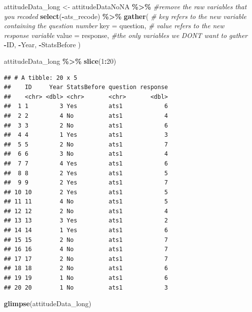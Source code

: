 \documentclass[
  12pt,
]{book}
\newenvironment{Shaded}{\begin{snugshade}}{\end{snugshade}}
\newcommand{\AttributeTok}[1]{\textcolor[rgb]{0.13,0.29,0.53}{#1}}
\newcommand{\CommentTok}[1]{\textcolor[rgb]{0.56,0.35,0.01}{\textit{#1}}}
\newcommand{\DecValTok}[1]{\textcolor[rgb]{0.00,0.00,0.81}{#1}}
\newcommand{\FunctionTok}[1]{\textcolor[rgb]{0.13,0.29,0.53}{\textbf{#1}}}
\newcommand{\NormalTok}[1]{#1}
\newcommand{\OtherTok}[1]{\textcolor[rgb]{0.56,0.35,0.01}{#1}}
\newcommand{\SpecialCharTok}[1]{\textcolor[rgb]{0.81,0.36,0.00}{\textbf{#1}}}
\begin{document}
\begin{Shaded}
\begin{Highlighting}[]
\NormalTok{attitudeData\_long }\OtherTok{\textless{}{-}} 
\NormalTok{  attitudeDataNoNA }\SpecialCharTok{\%\textgreater{}\%} 
  \CommentTok{\#remove the raw variables that you recoded}
  \FunctionTok{select}\NormalTok{(}\SpecialCharTok{{-}}\NormalTok{ats\_recode) }\SpecialCharTok{\%\textgreater{}\%} 
  \FunctionTok{gather}\NormalTok{(}
    \CommentTok{\# key refers to the new variable containing the question number}
    \AttributeTok{key =}\NormalTok{ question,}
    \CommentTok{\# value refers to the new response variable}
    \AttributeTok{value =}\NormalTok{ response, }
    \CommentTok{\#the only variables we DON\textquotesingle{}T want to gather}
    \SpecialCharTok{{-}}\NormalTok{ID, }\SpecialCharTok{{-}}\NormalTok{Year, }\SpecialCharTok{{-}}\NormalTok{StatsBefore }
\NormalTok{  )}

\NormalTok{attitudeData\_long }\SpecialCharTok{\%\textgreater{}\%} 
  \FunctionTok{slice}\NormalTok{(}\DecValTok{1}\SpecialCharTok{:}\DecValTok{20}\NormalTok{)}
\end{Highlighting}
\end{Shaded}

\begin{verbatim}
## # A tibble: 20 x 5
##    ID     Year StatsBefore question response
##    <chr> <dbl> <chr>       <chr>       <dbl>
##  1 1         3 Yes         ats1            6
##  2 2         4 No          ats1            4
##  3 3         2 No          ats1            6
##  4 4         1 Yes         ats1            3
##  5 5         2 No          ats1            7
##  6 6         3 No          ats1            4
##  7 7         4 Yes         ats1            6
##  8 8         2 Yes         ats1            5
##  9 9         2 Yes         ats1            7
## 10 10        2 Yes         ats1            5
## 11 11        4 No          ats1            5
## 12 12        2 No          ats1            4
## 13 13        3 Yes         ats1            2
## 14 14        1 Yes         ats1            6
## 15 15        2 No          ats1            7
## 16 16        4 No          ats1            7
## 17 17        2 No          ats1            7
## 18 18        2 No          ats1            6
## 19 19        1 No          ats1            6
## 20 20        1 No          ats1            3
\end{verbatim}

\begin{Shaded}
\begin{Highlighting}[]
\FunctionTok{glimpse}\NormalTok{(attitudeData\_long)}
\end{Highlighting}
\end{Shaded}
\end{document}
